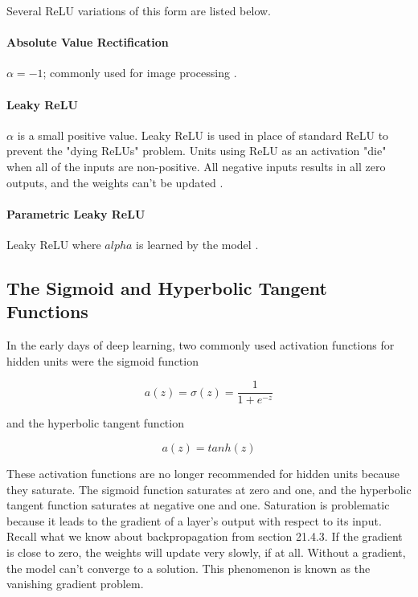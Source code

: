 \documentclass{article}
\begin{document}
Several ReLU variations of this form are listed below.

\paragraph{Absolute Value Rectification}\(\alpha = -1\); commonly used for image processing \cite{Goodfellow-et-al-2016}.

\paragraph{Leaky ReLU}\(\alpha\) is a small positive value. Leaky ReLU is used in place of standard ReLU to prevent the "dying ReLUs" problem. Units using ReLU as an activation "die" when all of the inputs are non-positive. All negative inputs results in all zero outputs, and the weights can't be updated \cite{hands-on-ml}.

\paragraph{Parametric Leaky ReLU}Leaky ReLU where \(alpha\) is learned by the model \cite{hands-on-ml}.

\subsection{The Sigmoid and Hyperbolic Tangent Functions}

In the early days of deep learning, two commonly used activation functions for hidden units were the sigmoid function

\[a(z) = \sigma (z) = \frac{1}{1 + e^{-z}}\]
    
and the hyperbolic tangent function

\[a(z) = tanh(z)\]

These activation functions are no longer recommended for hidden units because they saturate. The sigmoid function saturates at zero and one, and the hyperbolic tangent function saturates at  negative one and one. Saturation is problematic because it leads to the gradient of a layer's output with respect to its input. Recall what we know about backpropagation from section 21.4.3. If the gradient is close to zero, the weights will update very slowly, if at all. Without a gradient, the model can't converge to a solution. This phenomenon is known as the vanishing gradient problem.
\end{document}
